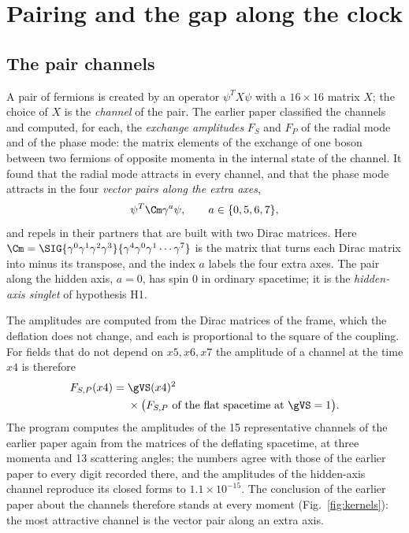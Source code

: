 \section{Pairing and the gap along the clock}
\label{sec:gap}

\subsection{The pair channels}

A pair of fermions is created by an operator $\psi^{T}X\psi$ with a $16\times16$ matrix $X$; the
choice of $X$ is the \emph{channel} of the pair. The earlier paper classified the channels and
computed, for each, the \emph{exchange amplitudes} $F_S$ and $F_P$ of the radial mode and of the
phase mode: the matrix elements of the exchange of one boson between two fermions of opposite
momenta in the internal state of the channel. It found that the radial mode attracts in every
channel, and that the phase mode attracts in the four \emph{vector pairs along the extra axes},
\begin{equation}
\psi^{T}\Cm\gamma^{a}\psi,\qquad a\in\{0,5,6,7\},
\label{eq:pairs}
\end{equation}
and repels in their partners that are built with two Dirac matrices. Here
$\Cm=\SIG{\gamma^{0}\gamma^{1}\gamma^{2}\gamma^{3}}{\gamma^{4}\gamma^{0}\gamma^{1}\cdots\gamma^{7}}$
is the matrix that turns each Dirac matrix into minus its transpose, and the index $a$ labels the
four extra axes. The pair along the hidden axis, $a=0$, has spin 0 in ordinary spacetime; it is the
\emph{hidden-axis singlet} of hypothesis H1.

The amplitudes are computed from the Dirac matrices of the frame, which the deflation does not
change, and each is proportional to the square of the coupling. For fields that do not depend on
$x5,x6,x7$ the amplitude of a channel at the time $x4$ is therefore
\begin{equation}
\begin{aligned}
F_{S,P}(x4)={}&\gVS(x4)^{2}\\
&\times\big(F_{S,P}\text{ of the flat spacetime at }\gVS=1\big).
\end{aligned}
\label{eq:amplitudes}
\end{equation}
The program computes the amplitudes of the 15 representative channels of the earlier paper again
from the matrices of the deflating spacetime, at three momenta and 13 scattering angles; the numbers
agree with those of the earlier paper to every digit recorded there,
and the amplitudes of the hidden-axis channel reproduce its closed forms to $1.1\times10^{-15}$. The
conclusion of the earlier paper about the channels therefore stands at every moment
(Fig.~\ref{fig:kernels}): the most attractive channel is the vector pair along an extra axis.

